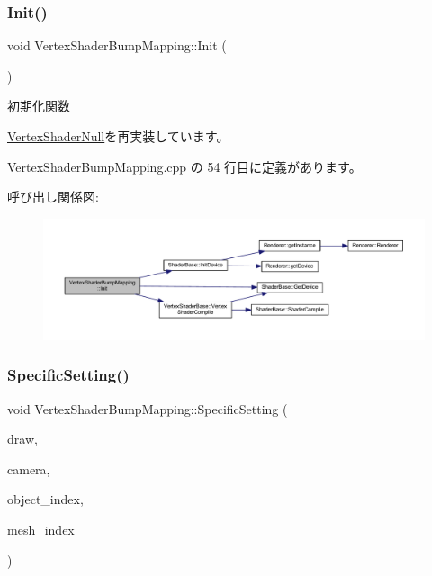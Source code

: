 \subsubsection{\texorpdfstring{Init()}{Init()}}
{\footnotesize\ttfamily void Vertex\+Shader\+Bump\+Mapping\+::\+Init (\begin{DoxyParamCaption}{ }\end{DoxyParamCaption})\hspace{0.3cm}{\ttfamily [virtual]}}



初期化関数 



\mbox{\hyperlink{class_vertex_shader_null_af30eb8057fe0537bc6ade214647b6fb5}{Vertex\+Shader\+Null}}を再実装しています。



 Vertex\+Shader\+Bump\+Mapping.\+cpp の 54 行目に定義があります。

呼び出し関係図\+:
\nopagebreak
\begin{figure}[H]
\begin{center}
\leavevmode
\includegraphics[width=350pt]{class_vertex_shader_bump_mapping_a6c0f59d1f29fd883943a66bfe61b6b03_cgraph}
\end{center}
\end{figure}
\mbox{\label{class_vertex_shader_bump_mapping_ad81d57336763441c4071f967b57dbce1}} 
\subsubsection{\texorpdfstring{Specific\+Setting()}{SpecificSetting()}}
{\footnotesize\ttfamily void Vertex\+Shader\+Bump\+Mapping\+::\+Specific\+Setting (\begin{DoxyParamCaption}\item[{\mbox{\hyperlink{class_draw_base}{Draw\+Base}} $\ast$}]{draw,  }\item[{\mbox{\hyperlink{class_camera}{Camera}} $\ast$}]{camera,  }\item[{unsigned}]{object\+\_\+index,  }\item[{unsigned}]{mesh\+\_\+index }\end{DoxyParamCaption})\hspace{0.3cm}{\ttfamily [virtual]}}



